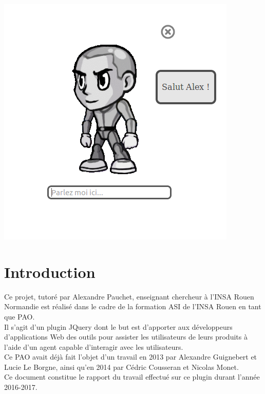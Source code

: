 \documentclass[11pt,dvipsnames,svgnames]{report}
\begin{document}
\newpage
\vspace*{\fill}
\begingroup
\centering
\includegraphics[]{images/agent.png}
 
\endgroup
\vspace*{\fill}


\newpage
\tableofcontents

\newpage


\chapter{Introduction}
	Ce projet, tutoré par Alexandre Pauchet, enseignant chercheur à l'INSA Rouen Normandie est réalisé dans le cadre de la formation ASI de l'INSA Rouen en tant que PAO.\\ 
	
	Il s'agit d'un plugin JQuery dont le but est d'apporter aux développeurs d'applications Web des outils pour assister les utilisateurs de leurs produits à l'aide d'un agent capable d’interagir avec les utilisateurs.\\
	
	Ce PAO avait déjà fait l'objet d'un travail en 2013 par Alexandre Guignebert et Lucie Le Borgne, ainsi qu'en 2014 par Cédric Cousseran et Nicolas Monet.\\
	
	Ce document constitue le rapport du travail effectué sur ce plugin durant l'année 2016-2017.
	
\end{document}
